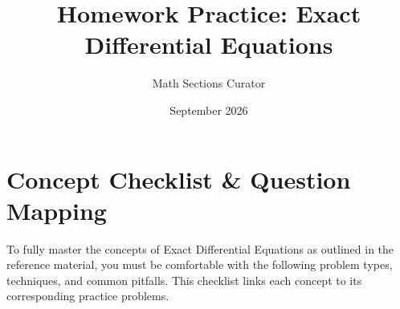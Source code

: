 \documentclass[11pt]{article}
\title{Homework Practice: Exact Differential Equations}
\author{Math Sections Curator}
\date{September 2026}
\begin{document}
\maketitle
\tableofcontents
\newpage

\section{Concept Checklist \& Question Mapping}

To fully master the concepts of Exact Differential Equations as outlined in the reference material, you must be comfortable with the following problem types, techniques, and common pitfalls. This checklist links each concept to its corresponding practice problems.
\end{document}
